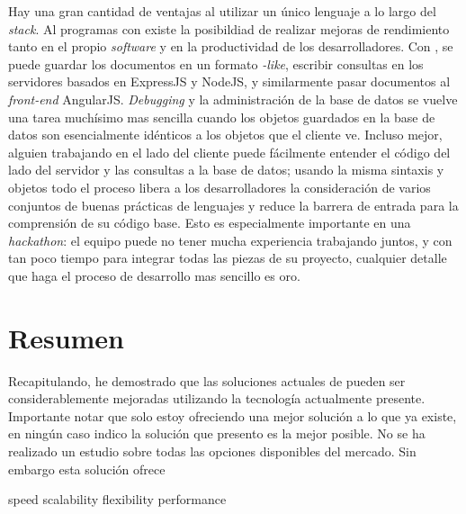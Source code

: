 Hay una gran cantidad de ventajas al utilizar un único lenguaje a lo largo del \textit{stack}. Al programas con  existe la posibildiad de realizar mejoras de rendimiento tanto en el propio \textit{software} y en la productividad de los desarrolladores. Con , se puede guardar los documentos en un formato \textit{-like}, escribir consultas  en los servidores basados en ExpressJS y NodeJS, y similarmente pasar documentos  al \textit{front-end} AngularJS. \textit{Debugging} y la administración de la base de datos se vuelve una tarea muchísimo mas sencilla cuando los objetos guardados en la base de datos son esencialmente idénticos a los objetos que el cliente  ve. Incluso mejor, alguien trabajando en el lado del cliente puede fácilmente entender el código del lado del servidor y las consultas a la base de datos; usando la misma sintaxis y objetos todo el proceso libera a los desarrolladores la consideración de varios conjuntos de buenas prácticas de lenguajes y reduce la barrera de entrada para la comprensión de su código base. Esto es especialmente importante en una \textit{hackathon}: el equipo puede no tener mucha experiencia trabajando juntos, y con tan poco tiempo para integrar todas las piezas de su proyecto, cualquier detalle que haga el proceso de desarrollo mas sencillo es oro.


\section{Resumen}
Recapitulando, he demostrado que las soluciones actuales de \ecommerce pueden ser considerablemente mejoradas utilizando la tecnología actualmente presente. 
Importante notar que solo estoy ofreciendo una mejor solución a lo que ya existe, en ningún caso indico la solución que presento es la mejor posible. No se ha realizado un estudio sobre todas las opciones disponibles del mercado. Sin embargo esta solución ofrece

speed
scalability
flexibility
performance
